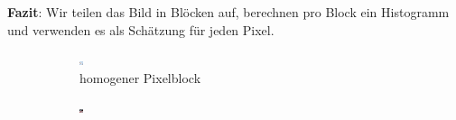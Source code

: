 \textbf{Fazit}: Wir teilen das Bild in Blöcken auf, berechnen pro Block ein Histogramm und verwenden es als Schätzung für jeden Pixel.

\begin{figure}[H]
    \centering
    \begin{subfigure}[b]{0.4\textwidth}
        \centering \includegraphics[interpolate=false, width=\linewidth]{content/TemporalerAlg/Bilder/APosteriori/homogener_ausschnitt_blocksize.png}
        \caption{homogener Pixelblock}
        \label{fig:homogener Pixelblock}
    \end{subfigure}
    \begin{subfigure}[b]{0.4\textwidth}
        \centering \includegraphics[interpolate=false,width=\linewidth]{content/TemporalerAlg/Bilder/APosteriori/inhomogener_ausschnitt_blocksize.png}

\end{subfigure}
\end{figure}
